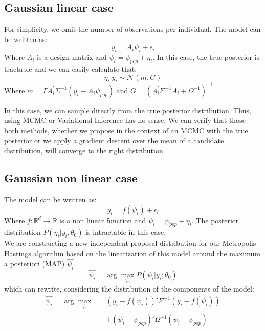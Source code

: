 \documentclass{article}
\begin{document}
\subsection{Gaussian linear case}
For simplicity, we omit the number of observations per individual. The model can be written as:
\begin{equation}
y_{i} = A_i \psi_i + \epsilon_{i} 
\end{equation}
Where $A_i$ is a design matrix and $\psi_i = \psi_{pop} + \eta_i$. In this case, the true posterior is tractable and we can easily calculate that:
\begin{equation}
\eta_i|y_i \sim \mathcal{N}(m,G)
\end{equation}
Where $m = \Gamma A_i^\prime \Sigma^{-1} (y_i - A_i\psi_{pop})$ and $G = (A_i^\prime\Sigma^{-1}A_i + \Omega^{-1})^{-1}$

In this case, we can sample directly from the true posterior distribution. Thus, using MCMC or Variational Inference has no sense. We can verify that those both methods, whether we propose in the context of an MCMC with the true posterior or we apply a gradient descent over the mean of a candidate distribution, will converge to the right distribution.

\subsection{Gaussian non linear case}
The model can be written as:
\begin{equation}
y_{i} = f(\psi_i) + \epsilon_{i} 
\end{equation}
Where $f:\mathbb{R}^d \to \mathbb{R}$ is a non linear function and $\psi_i = \psi_{pop} + \eta_i$. The posterior distribution $P(\eta_i|y_i,\theta_0)$ is intractable in this case.\\
We are constructing a new independent proposal distribution for our Metropolis Hastings algorithm based on the linearization of this model around the maximum a posteriori (MAP) $\hat{\psi_i}$.
\begin{equation}
\hat{\psi_i} = \arg \max \limits_{\psi_i} P(\psi_i | y_i ; \theta_0)
\end{equation}
which can rewrite, considering the distribution of the components of the model:
\begin{equation}
\begin{split}
\hat{\psi_i}  = \arg \max \limits_{\psi_i} \quad & (y_i-f(\psi_i))' \Sigma^{-1} (y_i-f(\psi_i)) \\
&  + (\psi_i - \psi_{pop})' \Omega^{-1} (\psi_i - \psi_{pop})
\end{split}
\end{equation}
\end{document}
